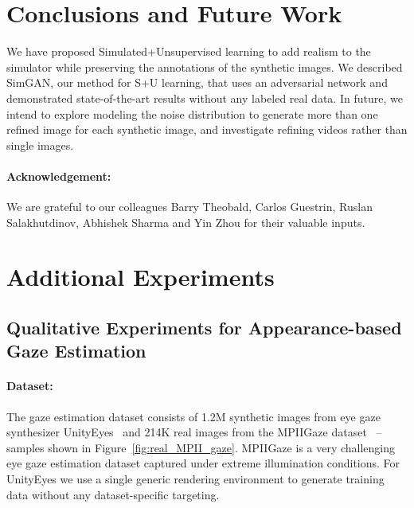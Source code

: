\documentclass[10pt,twocolumn,letterpaper]{article}
\begin{document}
\section{Conclusions and Future Work}
We have proposed Simulated+Unsupervised learning to add realism to the simulator while preserving the annotations of the synthetic images.
We described SimGAN, our method for S+U learning, that uses an adversarial network and demonstrated state-of-the-art results without any labeled real data. 
In future, we intend to explore modeling the noise distribution to generate more than one refined image for each synthetic image, and investigate refining videos rather than single images. 

\paragraph{Acknowledgement:} 
We are grateful to our colleagues Barry Theobald, Carlos Guestrin, Ruslan Salakhutdinov, Abhishek Sharma and Yin Zhou for their valuable inputs.

\pagebreak





\clearpage

\section*{Additional Experiments }


\subsection*{Qualitative Experiments for Appearance-based Gaze Estimation}


\paragraph{Dataset:} The gaze estimation dataset consists of 1.2M synthetic images from eye gaze synthesizer UnityEyes~\cite{Wood16} and 214K real images from the MPIIGaze dataset~\cite{Zhang15a} -- samples shown in Figure~\ref{fig:real_MPII_gaze}.
MPIIGaze is a very challenging eye gaze estimation dataset captured under extreme illumination conditions.
For UnityEyes we use a single generic rendering environment to generate training data without any dataset-specific targeting.
\end{document}
